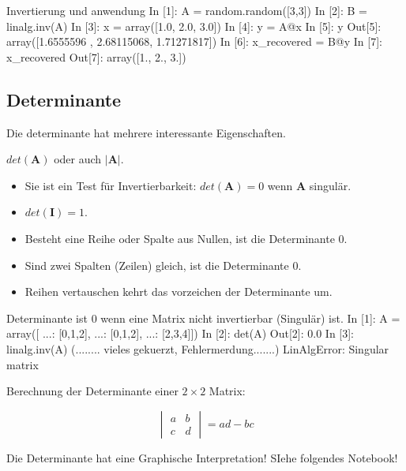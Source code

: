 \begin{python}{Invertierung und anwendung}
In [1]: A = random.random([3,3])
In [2]: B = linalg.inv(A)
In [3]: x = array([1.0, 2.0, 3.0])
In [4]: y = A@x
In [5]: y
Out[5]: array([1.6555596 , 2.68115068, 1.71271817])
In [6]: x_recovered = B@y
In [7]: x_recovered
Out[7]: array([1., 2., 3.])
\end{python}



\subsection*{Determinante}\label{sub:determinant}
Die determinante hat mehrere interessante Eigenschaften. 

$det (\mathbf{A})$ oder auch $|\mathbf{A}|$. 

\begin{itemize}
    \item Sie ist ein Test für Invertierbarkeit: $det(\mathbf{A})=0$ wenn $\mathbf{A}$ singulär.
    \item $det (\mathbf{I}) = 1$.
    \item Besteht eine Reihe oder Spalte aus Nullen, ist die Determinante 0.
    \item Sind zwei Spalten (Zeilen) gleich, ist die Determinante 0.
    \item Reihen vertauschen kehrt das vorzeichen der Determinante um.
\end{itemize}

\begin{python}{Determinante ist 0 wenn eine Matrix nicht invertierbar (Singulär) ist.}
In [1]: A = array([
    ...: [0,1,2],
    ...: [0,1,2],
    ...: [2,3,4]])
In [2]: det(A)
Out[2]: 0.0
In [3]: linalg.inv(A)
(........ vieles gekuerzt, Fehlermerdung.......)
LinAlgError: Singular matrix
\end{python}

Berechnung der Determinante einer $2 \times 2 $ Matrix:

$$ \begin{vmatrix} a & b  \\
                    c & d 

 \end{vmatrix} = ad - bc$$

Die Determinante hat eine Graphische Interpretation! SIehe folgendes Notebook!





